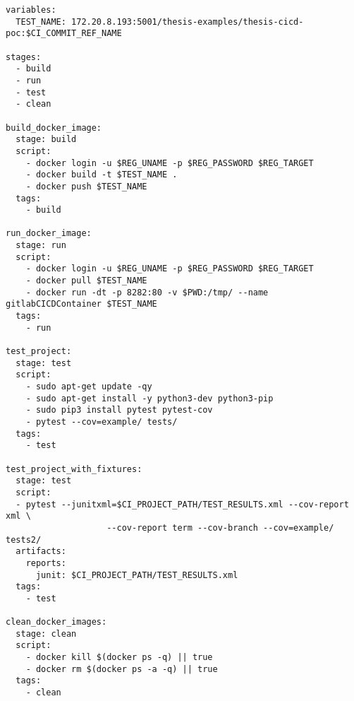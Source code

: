 
\begin{lstlisting}[frame=single, basicstyle=\tiny]
variables:
  TEST_NAME: 172.20.8.193:5001/thesis-examples/thesis-cicd-poc:$CI_COMMIT_REF_NAME

stages:
  - build
  - run
  - test
  - clean

build_docker_image:
  stage: build
  script:
    - docker login -u $REG_UNAME -p $REG_PASSWORD $REG_TARGET 
    - docker build -t $TEST_NAME .
    - docker push $TEST_NAME
  tags:
    - build

run_docker_image:
  stage: run
  script:
    - docker login -u $REG_UNAME -p $REG_PASSWORD $REG_TARGET
    - docker pull $TEST_NAME
    - docker run -dt -p 8282:80 -v $PWD:/tmp/ --name gitlabCICDContainer $TEST_NAME
  tags:
    - run

test_project:
  stage: test
  script:
    - sudo apt-get update -qy
    - sudo apt-get install -y python3-dev python3-pip
    - sudo pip3 install pytest pytest-cov
    - pytest --cov=example/ tests/
  tags:
    - test

test_project_with_fixtures:
  stage: test
  script:
  - pytest --junitxml=$CI_PROJECT_PATH/TEST_RESULTS.xml --cov-report xml \
                    --cov-report term --cov-branch --cov=example/ tests2/
  artifacts:
    reports:
      junit: $CI_PROJECT_PATH/TEST_RESULTS.xml
  tags:
    - test

clean_docker_images:
  stage: clean
  script:
    - docker kill $(docker ps -q) || true
    - docker rm $(docker ps -a -q) || true
  tags:
    - clean
\end{lstlisting}


